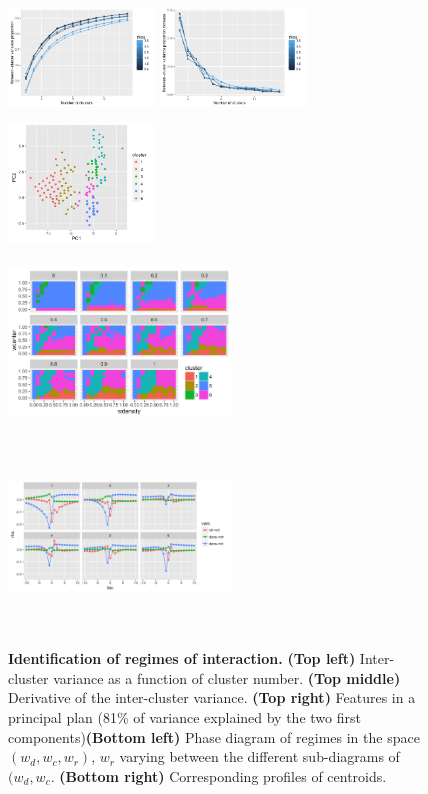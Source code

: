 \documentclass[english]{./sageo}
\begin{document}
\begin{figure}[h]
\centering
\includegraphics[width=3.9cm,height=3.2cm]{ccoef-knum_valuesFALSE_theta05-3.pdf}
\includegraphics[width=3.9cm,height=3.2cm]{dccoef-knum_valuesFALSEtheta05-3.pdf}
\includegraphics[width=3.9cm,height=3.2cm]{clusters-PCA-features_valuesFALSEtheta2_k6}\\
\includegraphics[width=5.9cm,height=5cm]{clusters-paramfacet_valuesFALSEtheta2_k6}
\includegraphics[width=5.9cm,height=5cm]{clusters-centertrajs-facetclust_valuesFALSEtheta2_k6}
\caption{\textbf{Identification of regimes of interaction.} \textbf{(Top left)} Inter-cluster variance as a function of cluster number. \textbf{(Top middle)} Derivative of the inter-cluster variance. \textbf{(Top right)} Features in a principal plan (81\% of variance explained by the two first components)\textbf{(Bottom left)} Phase diagram of regimes in the space $(w_{d},w_{c},w_{r})$, $w_r$ varying between the different sub-diagrams of $(w_{d},w_{c}$. \textbf{(Bottom right)} Corresponding profiles of centroids.}
\label{fig:clustering}
\end{figure}
\end{document}
